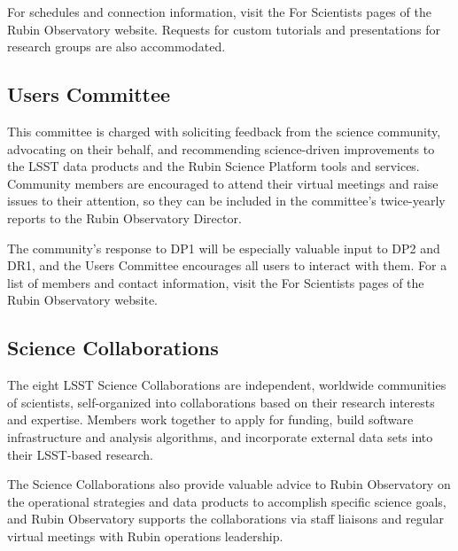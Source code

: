 For schedules and connection information, visit the For Scientists pages of the Rubin Observatory website.
Requests for custom tutorials and presentations for research groups are also accommodated.


\subsection{Users Committee
\label{ssec:users_committee}}

This committee is charged with soliciting feedback from the science community, advocating on their behalf, and recommending science-driven improvements to the \gls{LSST} data products and the Rubin Science Platform tools and services.
Community members are encouraged to attend their virtual meetings and raise issues to their attention, so they can be included in the committee's twice-yearly reports to the Rubin Observatory \gls{Director}.

The community's response to \gls{DP1} will be especially valuable input to \gls{DP2} and \gls{DR1}, and the Users Committee encourages all users to interact with them.
For a list of members and contact information, visit the For Scientists pages of the Rubin Observatory website.


\subsection{Science Collaborations
\label{ssec:science_collaborations}}

The eight \gls{LSST} Science Collaborations are independent, worldwide communities of scientists, self-organized into collaborations based on their research interests and expertise.
Members work together to apply for funding, build software infrastructure and analysis algorithms, and incorporate external data sets into their \gls{LSST}-based research.

The Science Collaborations also provide valuable advice to Rubin Observatory on the operational strategies and data products to accomplish specific science goals, and Rubin Observatory supports the collaborations via staff liaisons and regular virtual meetings with Rubin operations leadership.

